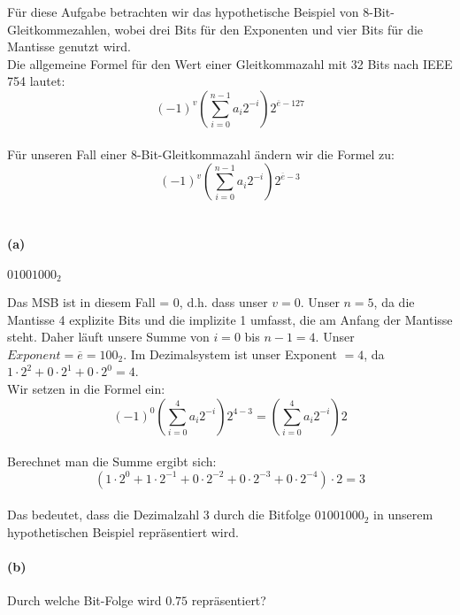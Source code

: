 \documentclass[12pt, letterpaper]{article}
\begin{document}
Für diese Aufgabe betrachten wir das hypothetische Beispiel von 8-Bit-Gleitkommezahlen, wobei drei Bits für den Exponenten und vier Bits für die Mantisse genutzt wird.\\ Die allgemeine Formel für den Wert einer Gleitkommazahl mit 32 Bits nach IEEE 754 lautet:\\

$$(-1)^v \left( \sum_{i=0}^{n-1} a_i 2^{-i} \right) 2^{\overline{e} - 127}$$\\

\noindent Für unseren Fall einer 8-Bit-Gleitkommazahl ändern wir die Formel zu:\\

$$(-1)^v \left( \sum_{i=0}^{n-1} a_i 2^{-i} \right) 2^{\overline{e} - 3}$$\\

\paragraph{(a)} $01001000_2$ \newline

\noindent Das MSB ist in diesem Fall = $0$, d.h. dass unser $v = 0$. Unser $n = 5$, da die Mantisse 4 explizite Bits und die implizite 1 umfasst, die am Anfang der Mantisse steht. Daher läuft unsere Summe von $i = 0$ bis $n - 1 = 4$.
Unser $Exponent = \overline{e} = 100_2$. Im Dezimalsystem ist unser Exponent $= 4$, da $1 \cdot 2^{2} + 0 \cdot 2^{1} + 0 \cdot 2^{0} = 4$.\\Wir setzen in die Formel ein:\\

$$(-1)^0 \left( \sum_{i=0}^{4} a_i 2^{-i} \right) 2^{4 - 3} = \left( \sum_{i=0}^{4} a_i 2^{-i} \right) 2$$\\

\noindent Berechnet man die Summe ergibt sich:\\

$$(1 \cdot 2^{0} + 1 \cdot 2^{-1} + 0 \cdot 2^{-2} + 0 \cdot 2^{-3} + 0 \cdot 2^{-4})\cdot 2 = 3$$\\

\noindent Das bedeutet, dass die Dezimalzahl 3 durch die Bitfolge $01001000_2$ in unserem hypothetischen Beispiel repräsentiert wird.

\paragraph{(b)} Durch welche Bit-Folge wird $0.75$ repräsentiert?\newline
\end{document}
